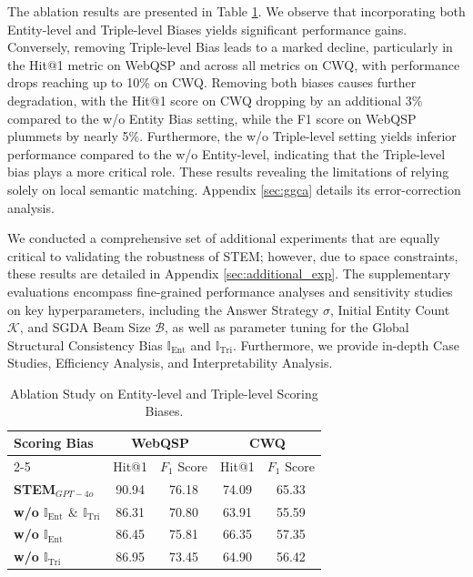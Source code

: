 \documentclass[11pt]{article}
\begin{document}
The ablation results are presented in Table \ref{tab:bias_abla}. We observe that incorporating both Entity-level and Triple-level Biases yields significant performance gains. Conversely, removing Triple-level Bias leads to a marked decline, particularly in the Hit@1 metric on WebQSP and across all metrics on CWQ, with performance drops reaching up to 10\% on CWQ. Removing both biases causes further degradation, with the Hit@1 score on CWQ dropping by an additional 3\% compared to the w/o Entity Bias setting, while the F1 score on WebQSP plummets by nearly 5\%. Furthermore, the w/o Triple-level setting yields inferior performance compared to the w/o Entity-level, indicating that the Triple-level bias plays a more critical role. These results revealing the limitations of relying solely on local semantic matching. Appendix \ref{sec:ggca}  details its error-correction analysis.

We conducted a comprehensive set of additional experiments that are equally critical to validating the robustness of STEM; however, due to space constraints, these results are detailed in Appendix \ref{sec:additional_exp}. The supplementary evaluations encompass fine-grained performance analyses and sensitivity studies on key hyperparameters, including the Answer Strategy $\sigma$, Initial Entity Count $\mathcal{K}$, and SGDA Beam Size $\mathcal{B}$, as well as parameter tuning for the Global Structural Consistency Bias \( \mathbb{I}_\text{Ent} \) and \( \mathbb{I}_\text{Tri} \). Furthermore, we provide in-depth Case Studies, Efficiency Analysis, and Interpretability Analysis.

\begin{table}[t]
\footnotesize
\centering
\renewcommand{\arraystretch}{1.15}
\setlength{\tabcolsep}{2.5pt} 

\begin{tabular}{l|cc|cc}
\toprule
\hline
\multirow{2}{*}{\textbf{Scoring Bias}} & 
\multicolumn{2}{c|}{\textbf{WebQSP}} & 
\multicolumn{2}{c}{\textbf{CWQ}} \\ \cline{2-5} 

& Hit@1 & $F_1$ Score & Hit@1 & $F_1$ Score \\ 

\hline
\textbf{STEM$_{GPT-4o}$}  & 90.94 & 76.18 & 74.09 & 65.33 \\
\textbf{\;\;\;\; w/o $\mathbb{I}_\text{Ent}$ $\&$ $\mathbb{I}_\text{Tri}$}  & 86.31 & 70.80 & 63.91 & 55.59 \\
\textbf{\;\;\;\; w/o $\mathbb{I}_\text{Ent}$}    & 86.45 & 75.81 & 66.35 & 57.35  \\
\textbf{\;\;\;\; w/o $\mathbb{I}_\text{Tri}$} & 86.95 & 73.45 & 64.90 & 56.42  \\ 
\hline
\bottomrule
\end{tabular}
\caption{Ablation Study on Entity-level and Triple-level Scoring Biases.}
\label{tab:bias_abla}
\end{table}
\end{document}
